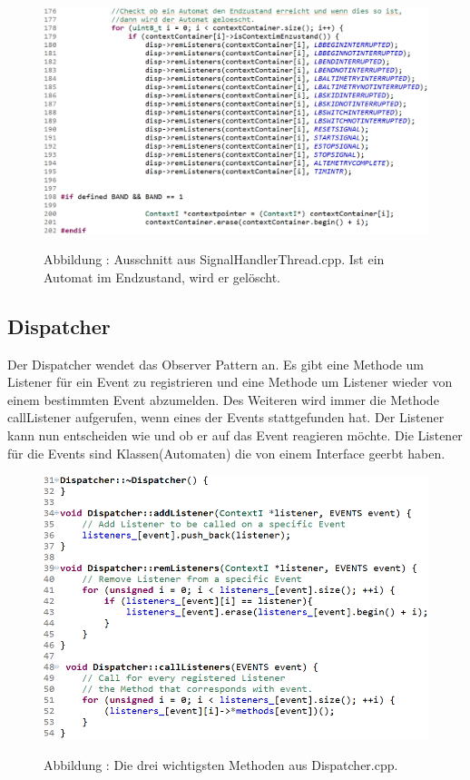 \documentclass[a4paper, 11pt]{article}
\begin{document}
\begin{figure}[H]
\centering
    \includegraphics[scale=0.6]{ISR/dellist.png}
    
    \small Abbildung \theimgcounter : Ausschnitt aus SignalHandlerThread.cpp. Ist ein Automat im Endzustand, wird er gelöscht.
    \label{dellist}
\end{figure}

\newpage

\subsection{Dispatcher}
Der Dispatcher wendet das Observer Pattern an. Es gibt eine Methode um Listener für ein Event zu registrieren und eine Methode um Listener wieder von einem bestimmten Event abzumelden. Des Weiteren wird immer die Methode callListener aufgerufen, wenn eines der Events stattgefunden hat. Der Listener kann nun entscheiden wie und ob er auf das Event reagieren möchte. Die Listener für die Events sind Klassen(Automaten) die von einem Interface geerbt haben.

\begin{figure}[H]
\centering 
    \includegraphics[scale=0.7]{ISR/dispatcher.png}
    
    \small Abbildung \theimgcounter : Die drei wichtigsten Methoden aus Dispatcher.cpp.
    \label{dispatcher}
\end{figure}
\end{document}
